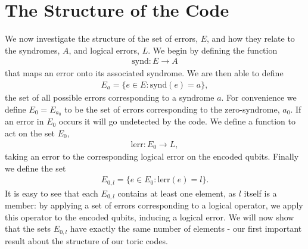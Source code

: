 \section{The Structure of the Code}

We now investigate the structure of the set of errors, $E$, and how they relate to the syndromes, $A$, and logical errors, $L$. We begin by defining the function
\begin{align}
  \text{synd}: E \rightarrow A
\end{align}
that maps an error onto its associated syndrome. We are then able to define
\begin{align}
  E_a = \{ e\in E : \text{synd}(e) = a \},
\end{align}
the set of all possible errors corresponding to a syndrome $a$. For convenience we define $E_0 = E_{a_0}$ to be the set of errors corresponding to the zero-syndrome, $a_0$. If an error in $E_0$ occurs it will go undetected by the code. We define a function to act on the set $E_0$,
\begin{align}
  \text{lerr}: E_0 \rightarrow L,
\end{align}
taking an error to the corresponding logical error on the encoded qubits. Finally we define the set
\begin{align}
  E_{0, l} = \{ e\in E_0: \text{lerr}(e) = l \}.
\end{align}
It is easy to see that each $E_{0, l}$ contains at least one element, as $l$ itself is a member: by applying a set of errors corresponding to a logical operator, we apply this operator to the encoded qubits, inducing a logical error.  We will now show that the sets $E_{0,l}$ have exactly the same number of elements - our first important result about the structure of our toric codes.


